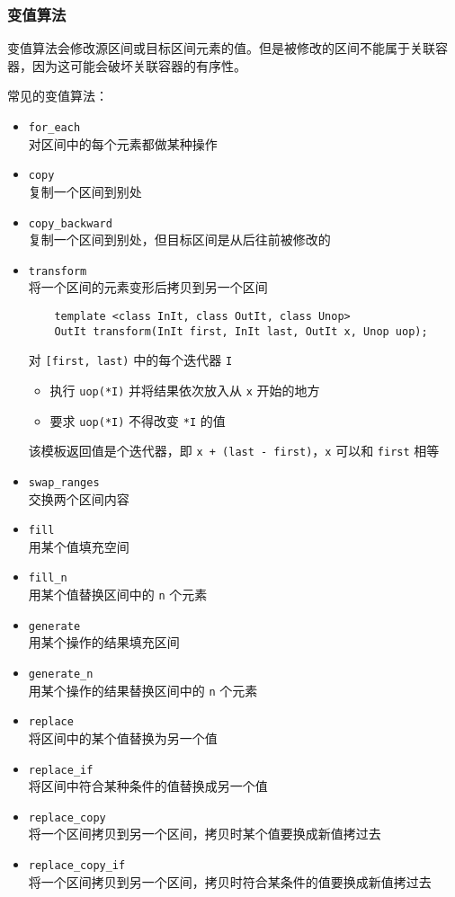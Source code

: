 \documentclass[UTF8]{ctexart}
\begin{document}
\subsubsection{变值算法}
变值算法会修改源区间或目标区间元素的值。但是被修改的区间不能属于关联容器，因为这可能会破坏关联容器的有序性。

常见的变值算法：
\begin{itemize}
    \item \texttt{for\_each} \\
    对区间中的每个元素都做某种操作
    \item \texttt{copy} \\
    复制一个区间到别处
    \item \texttt{copy\_backward} \\
    复制一个区间到别处，但目标区间是从后往前被修改的
    \item \texttt{transform} \\
    将一个区间的元素变形后拷贝到另一个区间
    \begin{verbatim}
    template <class InIt, class OutIt, class Unop>
    OutIt transform(InIt first, InIt last, OutIt x, Unop uop);
    \end{verbatim}
    对 \texttt{[first, last)} 中的每个迭代器 \texttt{I}
    \begin{itemize}
        \item 执行 \texttt{uop(*I)} 并将结果依次放入从 \texttt{x} 开始的地方
        \item 要求 \texttt{uop(*I)} 不得改变 \texttt{*I} 的值
    \end{itemize}
    该模板返回值是个迭代器，即 \texttt{x + (last - first)}，\texttt{x} 可以和 \texttt{first} 相等
    \item \texttt{swap\_ranges} \\
    交换两个区间内容
    \item \texttt{fill} \\
    用某个值填充空间
    \item \texttt{fill\_n} \\
    用某个值替换区间中的 \texttt{n} 个元素
    \item \texttt{generate} \\
    用某个操作的结果填充区间
    \item \texttt{generate\_n} \\
    用某个操作的结果替换区间中的 \texttt{n} 个元素
    \item \texttt{replace} \\
    将区间中的某个值替换为另一个值
    \item \texttt{replace\_if} \\
    将区间中符合某种条件的值替换成另一个值
    \item \texttt{replace\_copy} \\
    将一个区间拷贝到另一个区间，拷贝时某个值要换成新值拷过去
    \item \texttt{replace\_copy\_if} \\
    将一个区间拷贝到另一个区间，拷贝时符合某条件的值要换成新值拷过去
\end{itemize}
\end{document}
